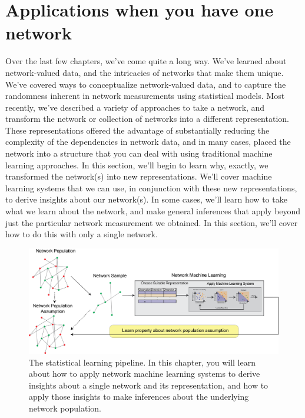 \chapter{Applications when you have one network}
\label{sec:ch7}

Over the last few chapters, we've come quite a long way. We've learned about network-valued data, and the intricacies of networks that make them unique. We've covered ways to conceptualize network-valued data, and to capture the randomness inherent in network measurements using statistical models. Most recently, we've described a variety of approaches to take a network, and transform the network or collection of networks into a different representation. These representations offered the advantage of substantially reducing the complexity of the dependencies in network data, and in many cases, placed the network into a structure that you can deal with using traditional machine learning approaches. In this section, we'll begin to learn why, exactly, we transformed the network(s) into new representations. We'll cover machine learning systems that we can use, in conjunction with these new representations, to derive insights about our network(s). In some cases, we'll learn how to take what we learn about the network, and make general inferences that apply beyond just the particular network measurement we obtained. In this section, we'll cover how to do this with only a single network.

\begin{figure}[h]
    \centering
    \includegraphics[width=\linewidth]{applications/ch7/Images/applications.png}
    \caption[Network machine learning applications schematic]{The statistical learning pipeline. In this chapter, you will learn about how to apply network machine learning systems to derive insights about a single network and its representation, and how to apply those insights to make inferences about the underlying network population.}
    \label{fig:ch7:netapps}
\end{figure}

